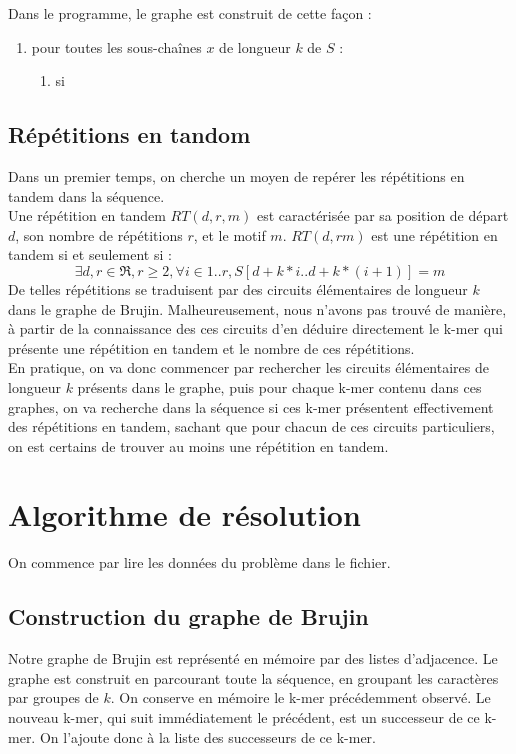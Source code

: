 \documentclass{article}
\begin{document}
Dans le programme, le graphe est construit de cette façon :
\begin{enumerate}
\item pour toutes les sous-chaînes $x$ de longueur $k$ de $S$ :
    \begin{enumerate}
    \item si 
    \end{enumerate}
\end{enumerate}

\subsection{Répétitions en tandom}
Dans un premier temps, on cherche un moyen de repérer les répétitions en tandem dans la séquence.\\
Une répétition en tandem $RT(d, r, m)$ est caractérisée par sa position de départ $d$, son nombre de répétitions $r$, et le motif $m$.
$RT(d,rm)$ est une répétition en tandem si et seulement si :
\[
\exists d,r \in \Re, r \ge 2, \forall i \in {1..r}, S[d+k*i..d+k*(i+1)] = m
\]
De telles répétitions se traduisent par des circuits élémentaires de longueur $k$ dans le graphe de Brujin. Malheureusement, nous n'avons pas trouvé de manière, à partir de la connaissance des ces circuits d'en déduire directement le k-mer qui présente une répétition en tandem et le nombre de ces répétitions.\\
En pratique, on va donc commencer par rechercher les circuits élémentaires de longueur $k$ présents dans le graphe, puis pour chaque k-mer contenu dans ces graphes, on va recherche dans la séquence si ces k-mer présentent effectivement des répétitions en tandem, sachant que pour chacun de ces circuits particuliers, on est certains de trouver au moins une répétition en tandem.

\section{Algorithme de résolution}

On commence par lire les données du problème dans le fichier.

\subsection{Construction du graphe de Brujin}

Notre graphe de Brujin est représenté en mémoire par des listes d'adjacence.
Le graphe est construit en parcourant toute la séquence, en groupant les caractères par groupes de $k$. On conserve en mémoire le k-mer précédemment observé. Le nouveau k-mer, qui suit immédiatement le précédent, est un successeur de ce k-mer. On l'ajoute donc à la liste des successeurs de ce k-mer.\\
\end{document}
